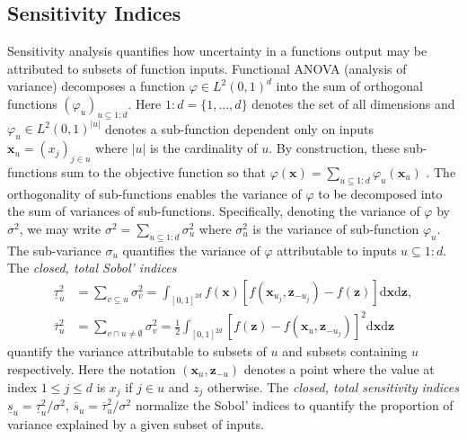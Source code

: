 \documentclass[graybox]{svmult}
\begin{document}
% 

\subsection{Sensitivity Indices}

Sensitivity analysis quantifies how uncertainty in a functions output may be attributed to subsets of function inputs. Functional ANOVA (analysis of variance) decomposes a function $\varphi \in L^2(0,1)^{d}$ into the sum of orthogonal functions $(\varphi_u)_{u \subseteq {1:d}}$. Here $1:d=\{1,\dots,d\}$ denotes the set of all dimensions and $\varphi_u \in L^2(0,1)^{\lvert u \rvert}$ denotes a sub-function dependent only on inputs $\boldsymbol{x}_u = (x_j)_{j \in u}$ where $\lvert u \rvert$ is the cardinality of $u$. By construction, these sub-functions sum to the objective function so that $\varphi(\boldsymbol{x}) = \sum_{u \subseteq 1:d} \varphi_u(\boldsymbol{x}_u)$ \cite[Appendix A]{mcbook}. The orthogonality of sub-functions enables the variance of $\varphi$ to be decomposed into the sum of variances of sub-functions. Specifically, denoting the variance of $\varphi$ by $\sigma^2$, we may write $\sigma^2 = \sum_{u \subseteq 1:d} \sigma^2_u$ where $\sigma^2_u$ is the variance of sub-function $\varphi_u$. The sub-variance $\sigma_u$ quantifies the variance of $\varphi$ attributable to inputs $u \subseteq 1:d$.  The \emph{closed, total Sobol' indices}
\begin{align*}
    \underline{\tau}_u^2 &= \sum_{v \subseteq u} \sigma^2_v = \int_{[0,1]^{2d}} f(\boldsymbol{x})[f(\boldsymbol{x}_{u_j},\boldsymbol{z}_{-{u_j}})-f(\boldsymbol{z})]\mathrm{d}\boldsymbol{x}\mathrm{d}\boldsymbol{z}, \\ 
    \overline{\tau}_u^2 &= \sum_{v \cap u \neq \emptyset} \sigma^2_v = \frac{1}{2}\int_{[0,1]^{2d}} [f(\boldsymbol{z})-f(\boldsymbol{x}_u,\boldsymbol{z}_{-{u_j}})]^2\mathrm{d}\boldsymbol{x}\mathrm{d}\boldsymbol{z}
    \label{eq:sobol_indices}
\end{align*}
quantify the variance attributable to subsets of $u$ and subsets containing $u$ respectively. Here the notation $(\boldsymbol{x}_{u},\boldsymbol{z}_{-u})$ denotes a point where the value at index $1 \leq j \leq d$ is $x_j$ if $j \in u$ and $z_j$ otherwise. The \emph{closed, total sensitivity indices} $\underline{s}_u = \underline{\tau}_u^2/\sigma^2$, $\overline{s}_u = \overline{\tau}_u^2/\sigma^2$ normalize the Sobol' indices to quantify the proportion of variance explained by a given subset of inputs. 
\end{document}
